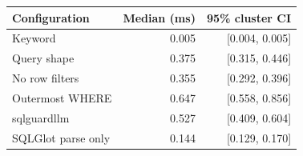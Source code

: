 \begin{tabular}{lrr}
\toprule
Configuration & Median (ms) & 95\% cluster CI \\
\midrule
Keyword & 0.005 & [0.004, 0.005] \\
Query shape & 0.375 & [0.315, 0.446] \\
No row filters & 0.355 & [0.292, 0.396] \\
Outermost WHERE & 0.647 & [0.558, 0.856] \\
sqlguardllm & 0.527 & [0.409, 0.604] \\
SQLGlot parse only & 0.144 & [0.129, 0.170] \\
\bottomrule
\end{tabular}
